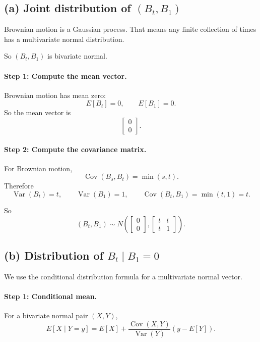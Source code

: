 \documentclass[11pt]{article}
\begin{document}
\subsection*{(a) Joint distribution of $(B_t,B_1)$}

Brownian motion is a Gaussian process.
That means any finite collection of times has a multivariate normal distribution.

So $(B_t,B_1)$ is bivariate normal.

\paragraph{Step 1: Compute the mean vector.}

Brownian motion has mean zero:
\[
E[B_t]=0, \qquad E[B_1]=0.
\]
So the mean vector is
\[
\begin{bmatrix}0\\0\end{bmatrix}.
\]

\paragraph{Step 2: Compute the covariance matrix.}

For Brownian motion,
\[
\operatorname{Cov}(B_s,B_t)=\min(s,t).
\]
Therefore
\[
\operatorname{Var}(B_t)=t,
\qquad
\operatorname{Var}(B_1)=1,
\qquad
\operatorname{Cov}(B_t,B_1)=\min(t,1)=t.
\]

So
\[
\boxed{
(B_t,B_1)\sim N\left(
\begin{bmatrix}0\\0\end{bmatrix},
\begin{bmatrix}
t & t\\
t & 1
\end{bmatrix}
\right).
}
\]

\subsection*{(b) Distribution of $B_t\mid B_1=0$}

We use the conditional distribution formula for a multivariate normal vector.

\paragraph{Step 1: Conditional mean.}

For a bivariate normal pair $(X,Y)$,
\[
E[X\mid Y=y]
=
E[X]+\frac{\operatorname{Cov}(X,Y)}{\operatorname{Var}(Y)}(y-E[Y]).
\]
\end{document}
